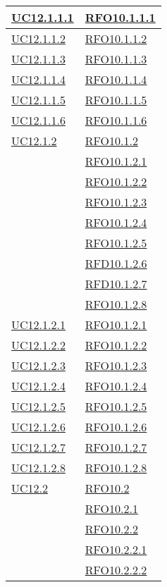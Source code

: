 \begin{longtable}{|>{\centering}m{5cm}|m{5cm}<{\centering}|}
\hyperlink{UC12.1.1.1}{UC12.1.1.1} & \hyperlink{RFO10.1.1.1}{RFO10.1.1.1}\\\hline
\hyperlink{UC12.1.1.2}{UC12.1.1.2} & \hyperlink{RFO10.1.1.2}{RFO10.1.1.2}\\\hline
\hyperlink{UC12.1.1.3}{UC12.1.1.3} & \hyperlink{RFO10.1.1.3}{RFO10.1.1.3}\\\hline
\hyperlink{UC12.1.1.4}{UC12.1.1.4} & \hyperlink{RFO10.1.1.4}{RFO10.1.1.4}\\\hline
\hyperlink{UC12.1.1.5}{UC12.1.1.5} & \hyperlink{RFO10.1.1.5}{RFO10.1.1.5}\\\hline
\hyperlink{UC12.1.1.6}{UC12.1.1.6} & \hyperlink{RFO10.1.1.6}{RFO10.1.1.6}\\\hline

\hyperlink{UC12.1.2}{UC12.1.2}
& \hyperlink{RFO10.1.2}{RFO10.1.2}\\
& \hyperlink{RFO10.1.2.1}{RFO10.1.2.1}\\
& \hyperlink{RFO10.1.2.2}{RFO10.1.2.2}\\
& \hyperlink{RFO10.1.2.3}{RFO10.1.2.3}\\
& \hyperlink{RFO10.1.2.4}{RFO10.1.2.4}\\
& \hyperlink{RFO10.1.2.5}{RFO10.1.2.5}\\
& \hyperlink{RFD10.1.2.6}{RFD10.1.2.6}\\
& \hyperlink{RFD10.1.2.7}{RFD10.1.2.7}\\
& \hyperlink{RFO10.1.2.8}{RFO10.1.2.8}\\\hline

\hyperlink{UC12.1.2.1}{UC12.1.2.1} & \hyperlink{RFO10.1.2.1}{RFO10.1.2.1}\\\hline
\hyperlink{UC12.1.2.2}{UC12.1.2.2} & \hyperlink{RFO10.1.2.2}{RFO10.1.2.2}\\\hline
\hyperlink{UC12.1.2.3}{UC12.1.2.3} & \hyperlink{RFO10.1.2.3}{RFO10.1.2.3}\\\hline
\hyperlink{UC12.1.2.4}{UC12.1.2.4} & \hyperlink{RFO10.1.2.4}{RFO10.1.2.4}\\\hline
\hyperlink{UC12.1.2.5}{UC12.1.2.5} & \hyperlink{RFO10.1.2.5}{RFO10.1.2.5}\\\hline
\hyperlink{UC12.1.2.6}{UC12.1.2.6} & \hyperlink{RFO10.1.2.6}{RFO10.1.2.6}\\\hline
\hyperlink{UC12.1.2.7}{UC12.1.2.7} & \hyperlink{RFO10.1.2.7}{RFO10.1.2.7}\\\hline
\hyperlink{UC12.1.2.8}{UC12.1.2.8} & \hyperlink{RFO10.1.2.8}{RFO10.1.2.8}\\\hline

\hyperlink{UC12.2}{UC12.2} 
& \hyperlink{RFO10.2}{RFO10.2}\\
& \hyperlink{RFO10.2.1}{RFO10.2.1}\\
& \hyperlink{RFO10.2.2}{RFO10.2.2}\\
& \hyperlink{RFO10.2.2.1}{RFO10.2.2.1}\\
& \hyperlink{RFO10.2.2.2}{RFO10.2.2.2}\\\hline


\end{longtable}
